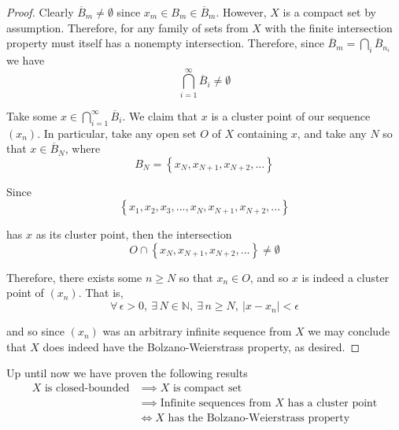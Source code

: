 \documentclass[12pt]{article}
\newlength\tindent
\renewcommand{\indent}{\hspace*{\tindent}}
\newcommand{\N}{\mathbb N}
\begin{document}
\begin{proof}
\indent Clearly $\overline{B}_m \neq \emptyset$ since $x_m \in B_m \in \overline{B}_m$. However, $X$ is a compact set by assumption. Therefore, for any family of sets from $X$ with the finite intersection property must itself has a nonempty intersection. Therefore, since $\overline{B}_m = \bigcap_{i} \overline{B}_{n_i}$ we have
\begin{equation*}
	\bigcap^\infty_{i = 1} \overline{B}_i \neq \emptyset
\end{equation*}

\indent Take some $x \in \bigcap^\infty_{i = 1} \overline{B}_i$. We claim that $x$ is a cluster point of our sequence $(x_n)$. In particular, take any open set $O$ of $X$ containing $x$, and take any $N$ so that $x \in \overline{B}_N$, where
\begin{equation*}
	B_N = \left\{ x_N, x_{N + 1}, x_{N + 2}, ... \right\}
\end{equation*}

Since
\begin{equation*}
	\left\{x_1, x_2, x_3, ..., x_N, x_{N + 1}, x_{N + 2}, ... \right\}
\end{equation*}

has $x$ as its cluster point, then the intersection
\begin{equation*}
	O \cap \left\{ x_N, x_{N + 1}, x_{N + 2}, ... \right\} \neq \emptyset
\end{equation*}

\indent Therefore, there exists some $n \geq N$ so that $x_n \in O$, and so $x$ is indeed a cluster point of $(x_n)$. That is,
\begin{equation*}
	\forall\,\epsilon > 0,~\exists\,N\in\N,~\exists\,n\geq N,~ |x - x_n| < \epsilon
\end{equation*}

and so since $(x_n)$ was an arbitrary infinite sequence from $X$ we may conclude that $X$ does indeed have the Bolzano-Weierstrass property, as desired.
\end{proof} \hfill

Up until now we have proven the following results
\begin{align*}
	\text{$X$ is closed-bounded} &\implies \text{$X$ is compact set} \\
	&\implies \text{Infinite sequences from $X$ has a cluster point} \\
	&\iff \text{$X$ has the Bolzano-Weierstrass property}
\end{align*}
\end{document}
